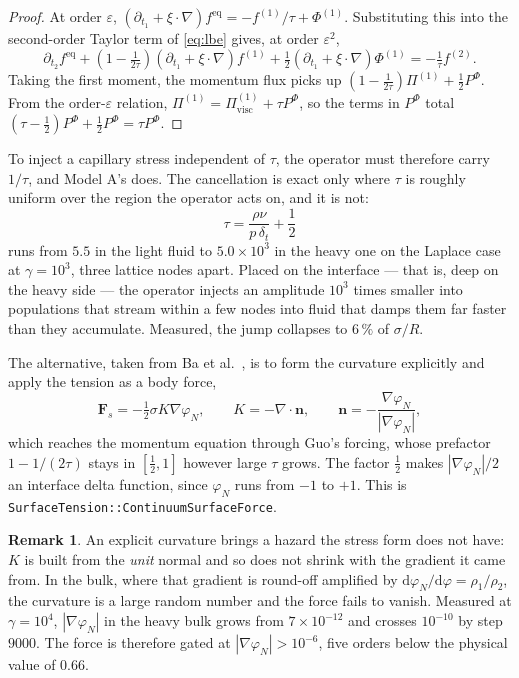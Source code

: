 \documentclass[11pt,a4paper]{article}
\theoremstyle{plain}
\theoremstyle{definition}
\newtheorem{remark}{Remark}
\newcommand{\nn}{\mathbf{n}}
\newcommand{\FF}{\mathbf{F}}
\begin{document}
\begin{proof}
At order $\varepsilon$, $(\partial_{t_1} + \xi\!\cdot\!\nabla) f^{\mathrm{eq}}
= -f^{(1)}/\tau + \Phi^{(1)}$. Substituting this into the second-order Taylor
term of \eqref{eq:lbe} gives, at order $\varepsilon^2$,
\begin{equation}
  \partial_{t_2} f^{\mathrm{eq}}
  + \left(1 - \tfrac{1}{2\tau}\right)(\partial_{t_1} + \xi\!\cdot\!\nabla)f^{(1)}
  + \tfrac12 (\partial_{t_1} + \xi\!\cdot\!\nabla)\Phi^{(1)} = -\tfrac{1}{\tau}f^{(2)}.
\end{equation}
Taking the first moment, the momentum flux picks up
$(1 - \tfrac{1}{2\tau})\Pi^{(1)} + \tfrac12 P^\Phi$. From the order-$\varepsilon$
relation, $\Pi^{(1)} = \Pi^{(1)}_{\mathrm{visc}} + \tau P^\Phi$, so the terms in
$P^\Phi$ total $(\tau - \tfrac12)P^\Phi + \tfrac12 P^\Phi = \tau P^\Phi$. \qedhere
\end{proof}

To inject a capillary stress independent of $\tau$, the operator must therefore
carry $1/\tau$, and Model A's does. The cancellation is exact only where $\tau$
is roughly uniform over the region the operator acts on, and it is not:
\begin{equation}
  \tau = \frac{\rho\nu}{p\,\delta_t} + \frac12
\end{equation}
runs from $5.5$ in the light fluid to $5.0\times10^3$ in the heavy one on the
Laplace case at $\gamma = 10^3$, three lattice nodes apart. Placed on the
interface --- that is, deep on the heavy side --- the operator injects an
amplitude $10^3$ times smaller into populations that stream within a few nodes
into fluid that damps them far faster than they accumulate. Measured, the jump
collapses to $6\,\%$ of $\sigma/R$.

The alternative, taken from Ba et al.~\cite{ba2016}, is to form the curvature
explicitly and apply the tension as a body force,
\begin{equation}
  \FF_s = -\tfrac12 \sigma K \nabla\varphi_N, \qquad
  K = -\nabla\!\cdot\!\nn, \qquad
  \nn = -\frac{\nabla\varphi_N}{|\nabla\varphi_N|},
  \label{eq:csf}
\end{equation}
which reaches the momentum equation through Guo's forcing, whose prefactor
$1 - 1/(2\tau)$ stays in $[\tfrac12, 1]$ however large $\tau$ grows. The factor
$\tfrac12$ makes $|\nabla\varphi_N|/2$ an interface delta function, since
$\varphi_N$ runs from $-1$ to $+1$. This is
\texttt{SurfaceTension::ContinuumSurfaceForce}.

\begin{remark}
An explicit curvature brings a hazard the stress form does not have: $K$ is
built from the \emph{unit} normal and so does not shrink with the gradient it
came from. In the bulk, where that gradient is round-off amplified by
$\mathrm{d}\varphi_N/\mathrm{d}\varphi = \rho_1/\rho_2$, the curvature is a
large random number and the force fails to vanish. Measured at $\gamma = 10^4$,
$|\nabla\varphi_N|$ in the heavy bulk grows from $7\times10^{-12}$ and crosses
$10^{-10}$ by step $9000$. The force is therefore gated at
$|\nabla\varphi_N| > 10^{-6}$, five orders below the physical value of $0.66$.
\end{remark}
\end{document}
